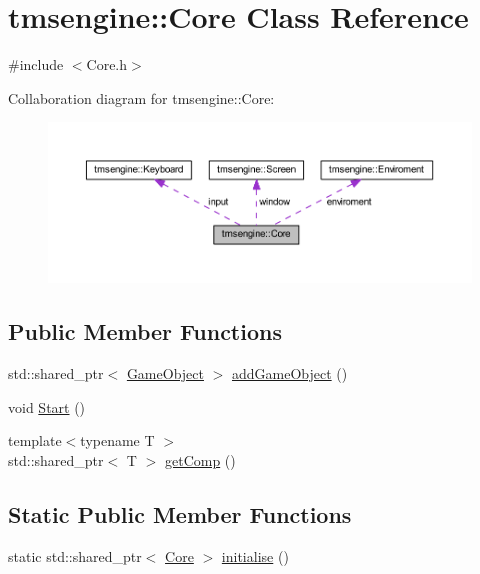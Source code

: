\hypertarget{classtmsengine_1_1_core}{}\section{tmsengine\+:\+:Core Class Reference}
\label{classtmsengine_1_1_core}


{\ttfamily \#include $<$Core.\+h$>$}



Collaboration diagram for tmsengine\+:\+:Core\+:\nopagebreak
\begin{figure}[H]
\begin{center}
\leavevmode
\includegraphics[width=350pt]{classtmsengine_1_1_core__coll__graph}
\end{center}
\end{figure}
\subsection*{Public Member Functions}
\begin{DoxyCompactItemize}
\item 
std\+::shared\+\_\+ptr$<$ \hyperlink{classtmsengine_1_1_game_object}{Game\+Object} $>$ \hyperlink{classtmsengine_1_1_core_a6e341b3f9754d7b9ba9ad49bdf701eb6}{add\+Game\+Object} ()
\item 
void \hyperlink{classtmsengine_1_1_core_af5819357f7cfe0674d4410a606dda3ac}{Start} ()
\item 
{\footnotesize template$<$typename T $>$ }\\std\+::shared\+\_\+ptr$<$ T $>$ \hyperlink{classtmsengine_1_1_core_a45b0f8b3b3edfc6db29707d5b7cce859}{get\+Comp} ()
\end{DoxyCompactItemize}
\subsection*{Static Public Member Functions}
\begin{DoxyCompactItemize}
\item 
static std\+::shared\+\_\+ptr$<$ \hyperlink{classtmsengine_1_1_core}{Core} $>$ \hyperlink{classtmsengine_1_1_core_a6a1dbfaeefd113b669d9a72f828faab7}{initialise} ()
\end{DoxyCompactItemize}
